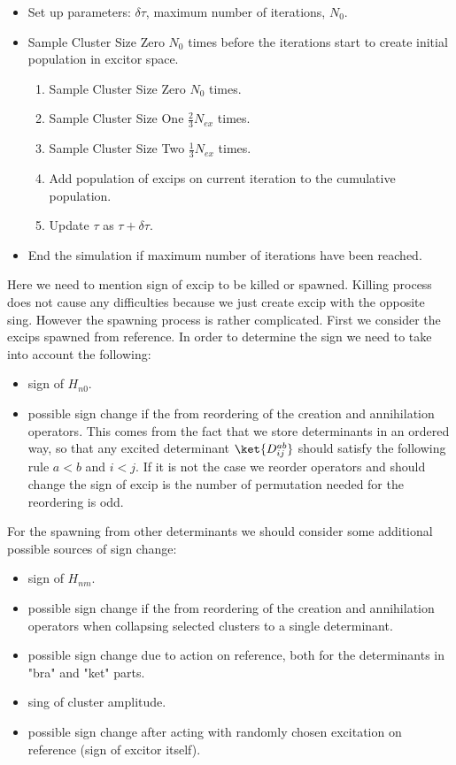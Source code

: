 \begin{tcolorbox}
	\begin{itemize}
		\item Set up parameters: $\delta\tau$, maximum number of iterations, $N_0$.
		\item Sample Cluster Size Zero $N_0$ times before the iterations start to create initial population in excitor space.
		\begin{enumerate} 
			\item Sample Cluster Size Zero $N_0$ times.
			\item Sample Cluster Size One $\frac{2}{3}N_{ex}$ times.
			\item Sample Cluster Size Two $\frac{1}{3}N_{ex}$ times.
			\item Add population of excips on current iteration to the cumulative population.
			\item Update $\tau$ as $\tau+ \delta\tau$.
		\end{enumerate} 
	\item End the simulation if maximum number of iterations have been reached.
	\end{itemize}
\end{tcolorbox}

Here we need to mention sign of excip to be killed or spawned. Killing process does not cause any difficulties because we just create excip with the opposite sing. However the spawning process is rather complicated. First we consider the excips spawned from reference. In order to determine the sign we need to take into account the following:
\begin{itemize}
\item sign of $H_{n0}$.
\item possible sign change if the from reordering of the creation and annihilation operators. This comes from the fact that we store determinants in an ordered way, so that any excited determinant $\ket{D_{ij}^{ab}}$ should satisfy the following rule $a<b$ and $i<j$. If it is not the case we reorder operators and should change the sign of excip is the number of permutation needed for the reordering is odd.
\end{itemize} 
For the spawning from other determinants we should consider some additional possible sources of sign change:
\begin{itemize}
	\item sign of $H_{nm}$.
	\item possible sign change if the from reordering of the creation and annihilation operators when collapsing selected clusters to a single determinant.
	\item possible sign change due to action on reference, both for the determinants in "bra" and "ket" parts.
	\item sing of cluster amplitude.
	\item possible sign change after acting with randomly chosen excitation on reference (sign of excitor itself).
\end{itemize} 

